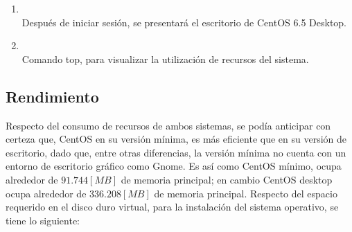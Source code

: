 \documentclass[11pt]{article}
\begin{document}
\begin{enumerate}
	        \item
	        	\begin{minipage}[t]{\linewidth}
			        \raggedright
			        \medskip
			        \\Después de iniciar sesión, se presentará el escritorio de CentOS 6.5 Desktop.
		        \end{minipage}

		    \item
	        	\begin{minipage}[t]{\linewidth}
			        \raggedright
			        \medskip
			        \\Comando top, para visualizar la utilización de recursos del sistema.
		        \end{minipage}
		    \end{enumerate}

		    
\subsection{Rendimiento}
Respecto del consumo de recursos de ambos sistemas, se podía anticipar con certeza que, CentOS en su versión mínima, es más eficiente que en su versión de escritorio, dado que, entre otras diferencias, la versión mínima no cuenta con un entorno de escritorio gráfico como Gnome. Es así como CentOS mínimo, ocupa alrededor de $91.744 [MB]$ de memoria principal; en cambio CentOS desktop ocupa alrededor de $336.208 [MB]$ de memoria principal. Respecto del espacio requerido en el disco duro virtual, para la instalación del sistema operativo, se tiene lo siguiente: 
\end{document}
